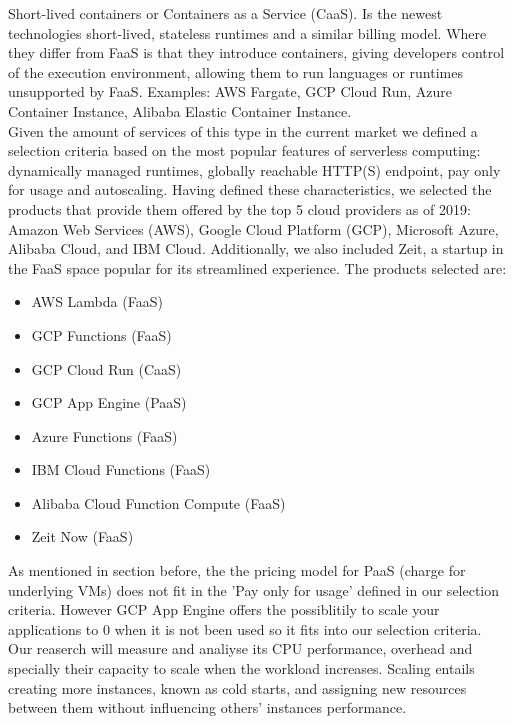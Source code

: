 \documentclass[11pt]{article}
\begin{document}
Short-lived containers or Containers as a Service (CaaS). Is the newest technologies short-lived, stateless runtimes and a similar billing model. Where they differ from FaaS is that they introduce containers, giving developers control of the execution environment, allowing them to run languages or runtimes unsupported by FaaS. Examples: AWS Fargate, GCP Cloud Run, Azure Container Instance, Alibaba Elastic Container Instance. \\

Given the amount of services of this type in the current market we defined a selection criteria based on the most popular features \cite{popular1} of serverless computing: dynamically managed runtimes, globally reachable HTTP(S) endpoint, pay only for usage and autoscaling. Having defined these characteristics, we selected the products that provide them offered by the top 5 cloud providers as of 2019: Amazon Web Services (AWS), Google Cloud Platform (GCP), Microsoft Azure, Alibaba Cloud, and IBM Cloud. Additionally, we also included Zeit, a startup in the FaaS space popular for its streamlined experience. The products selected are:

\begin{multicols}{2}
\begin{itemize}
\item AWS Lambda (FaaS)
\item GCP Functions (FaaS)
\item GCP Cloud Run (CaaS)
\item GCP App Engine (PaaS)
\item Azure Functions (FaaS)
\item IBM Cloud Functions (FaaS)
\item Alibaba Cloud Function Compute (FaaS)
\item Zeit Now (FaaS) 
\end{itemize}
\end{multicols}

As mentioned in section before, the the pricing model for PaaS (charge for underlying VMs) does not fit in the 'Pay only for usage' defined in our selection criteria. However GCP App Engine offers the possiblitily to scale your applications to 0 when it is not been used so it fits into our selection criteria. \\

Our reaserch will measure and analiyse its CPU performance, overhead and specially their capacity to scale when the workload increases. Scaling entails creating more instances, known as cold starts, and assigning new resources between them without influencing others' instances performance. 
\end{document}
